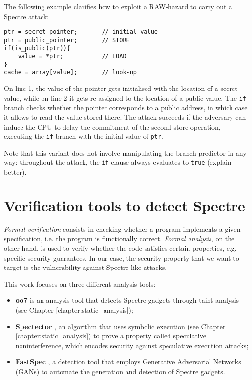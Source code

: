 \documentclass[12pt,a4paper]{book}
\theoremstyle{definition}
\begin{document}
	The following example clarifies how to exploit a RAW-hazard to carry out a Spectre attack:
	\begin{lstlisting}
ptr = secret_pointer;		// initial value
ptr = public_pointer;		// STORE
if(is_public(ptr)){	
	value = *ptr;			// LOAD
}
cache = array[value];		// look-up
	\end{lstlisting}
	On line 1, the value of the pointer gets initialised with the location of a secret value, while on line 2 it gets re-assigned to the location of a public value. The \texttt{if} branch checks whether the pointer corresponds to a public address, in which case it allows to read the value stored there. The attack succeeds if the adversary can induce the CPU to delay the commitment of the second store operation, executing the \texttt{if} branch with the initial value of \texttt{ptr}.
	
	Note that this variant does not involve manipulating the branch predictor in any way: throughout the attack, the \texttt{if} clause always evaluates to \texttt{true} (explain better).
	
	\chapter{Verification tools to detect Spectre}\label{chapter:verification}
	
	\textit{Formal verification} consists in checking whether a program implements a given specification, i.e. the program is functionally correct. \textit{Formal analysis}, on the other hand, is used to verify whether the code satisfies certain properties, e.g. specific security guarantees. In our case, the security property that we want to target is the vulnerability against Spectre-like attacks. 
	
	This work focuses on three different analysis tools:
	\begin{itemize}
		\begin{comment}
		\item \textbf{Jasmin}\cite{Almeida2017}, a framework for developing high speed and high-assurance cryptographic software;
		\end{comment}
		\item \textbf{oo7} \cite{Wang2019} is an analysis tool that detects Spectre gadgets through taint analysis (see Chapter \ref{chapter:static_analysis});
		\item \textbf{Spectector} \cite{Guarnieri2018}, an algorithm that uses symbolic execution (see Chapter \ref{chapter:static_analysis}) to prove a property called speculative noninterference, which encodes security against speculative execution attacks;
		\item \textbf{FastSpec} \cite{Tol2021}, a detection tool that employs Generative Adversarial Networks (GANs) to  automate the generation and detection of Spectre gadgets.
	\end{itemize}
	
\end{document}
